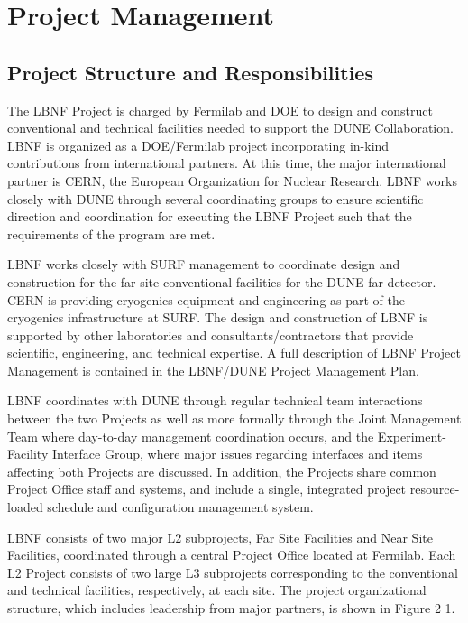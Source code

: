 \chapter{Project Management}
\label{ch:intro-pm}

\section{Project Structure and Responsibilities}

The LBNF Project is charged by Fermilab and DOE to design and construct conventional and technical facilities needed to support the DUNE Collaboration. LBNF is organized as a DOE/Fermilab project incorporating in-kind contributions from international partners. At this time, the major international partner is CERN, the European Organization for Nuclear Research. LBNF works closely with DUNE through several coordinating groups to ensure scientific direction and coordination for executing the LBNF Project such that the requirements of the program are met. 

LBNF works closely with SURF management to coordinate design and construction for the far site conventional facilities for the DUNE far detector. CERN is providing cryogenics equipment and engineering as part of the cryogenics infrastructure at SURF. The design and construction of LBNF is supported by other laboratories and consultants/contractors that provide scientific, engineering, and technical expertise.  A full description of LBNF Project Management is contained in the LBNF/DUNE Project Management Plan\cite{PMP-10770}.

LBNF coordinates with DUNE through regular technical team interactions between the two Projects as well as more formally through the Joint Management Team where day-to-day management coordination occurs, and the Experiment-Facility Interface Group, where major issues regarding interfaces and items affecting both Projects are discussed. In addition, the Projects share common Project Office staff and systems, and include a single, integrated project resource-loaded schedule and configuration management system. 


 


LBNF consists of two major L2 subprojects, Far Site Facilities and Near Site Facilities, coordinated through a central Project Office located at Fermilab.  Each L2 Project consists of two large L3 subprojects corresponding to the conventional and technical facilities, respectively, at each site. The project organizational structure, which includes leadership from major partners, is shown in Figure 2 1.


